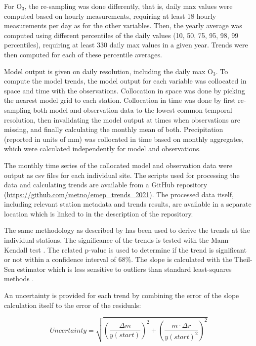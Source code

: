 For O$_3$, the re-sampling was done differently, that is, daily max values were computed based on hourly measurements, requiring at least 18 hourly measurements per day as for the other variables. Then, the yearly average was computed using different percentiles of the daily values (10, 50, 75, 95, 98, 99 percentiles), requiring at least 330 daily max values in a given year. Trends were then computed for each of these percentile averages.

Model output is given on daily resolution, including the daily max O$_3$. To compute the model trends, the model output for each variable was collocated in space and time with the observations. Collocation in space was done by picking the nearest model grid to each station. Collocation in time was done by first re-sampling both model and observation data to the lowest common temporal resolution, then invalidating the model output at times when observations are missing, and finally calculating the monthly mean of both. Precipitation (reported in units of mm) was collocated in time based on monthly aggregates, which were calculated independently for model and observations.

The monthly time series of the collocated model and observation data were output as csv files for each individual site. The scripts used for processing the data and calculating trends are available from a GitHub repository (\url{https://github.com/metno/emep_trends_2021}). The processed data itself, including relevant station metadata and trends results, are available in a separate location which is linked to in the description of the repository.

The same methodology as described by \cite{aas2019global, mortier2020} has been used to derive the trends at the individual stations. The significance of the trends is tested with the Mann-Kendall test \citep{hamed1998modified}. The related p-value is used to determine if the trend is significant or not within a confidence interval of 68\%. The slope is calculated with the Theil-Sen estimator which is less sensitive to outliers than standard least-squares methods \citep{sen1968estimates}.

An uncertainty is provided for each trend by combining the error of the slope calculation itself to the error of the residuals:

\begin{equation}
 Uncertainty = \sqrt{{\left (\frac{\Delta m}{y(start)}\right )}^{2} + {\left ( \frac{m \cdot \Delta r}{y(start)^2}\right )}^{2} }
\end{equation}

